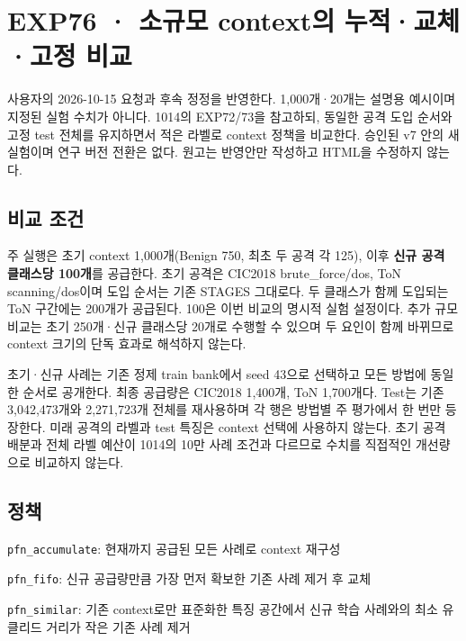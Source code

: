 \section{EXP76 · 소규모 context의 누적·교체·고정 비교}
사용자의 2026-10-15 요청과 후속 정정을 반영한다. 1,000개·20개는 설명용 예시이며 지정된 실험 수치가 아니다. 1014의 EXP72/\allowbreak{}73을 참고하되, 동일한 공격 도입 순서와 고정 test 전체를 유지하면서 적은 라벨로 context 정책을 비교한다. 승인된 v7 안의 새 실험이며 연구 버전 전환은 없다. 원고는 반영안만 작성하고 HTML을 수정하지 않는다.

\subsection{비교 조건}
주 실행은 초기 context 1,000개(Benign 750, 최초 두 공격 각 125), 이후 \textbf{신규 공격 클래스당 100개}를 공급한다. 초기 공격은 CIC2018 brute\_\allowbreak{}force/\allowbreak{}dos, ToN scanning/\allowbreak{}dos이며 도입 순서는 기존 STAGES 그대로다. 두 클래스가 함께 도입되는 ToN 구간에는 200개가 공급된다. 100은 이번 비교의 명시적 실험 설정이다. 추가 규모 비교는 초기 250개·신규 클래스당 20개로 수행할 수 있으며 두 요인이 함께 바뀌므로 context 크기의 단독 효과로 해석하지 않는다.

초기·신규 사례는 기존 정제 train bank에서 seed 43으로 선택하고 모든 방법에 동일한 순서로 공개한다. 최종 공급량은 CIC2018 1,400개, ToN 1,700개다. Test는 기존 3,042,473개와 2,271,723개 전체를 재사용하며 각 행은 방법별 주 평가에서 한 번만 등장한다. 미래 공격의 라벨과 test 특징은 context 선택에 사용하지 않는다. 초기 공격 배분과 전체 라벨 예산이 1014의 10만 사례 조건과 다르므로 수치를 직접적인 개선량으로 비교하지 않는다.

\subsection{정책}
\par\noindent \textbullet\enspace \texttt{pfn\_\allowbreak{}\allowbreak{}accu\allowbreak{}mulate}: 현재까지 공급된 모든 사례로 context 재구성


\par\noindent \textbullet\enspace \texttt{pfn\_\allowbreak{}\allowbreak{}fifo\allowbreak{}}: 신규 공급량만큼 가장 먼저 확보한 기존 사례 제거 후 교체


\par\noindent \textbullet\enspace \texttt{pfn\_\allowbreak{}\allowbreak{}simi\allowbreak{}lar}: 기존 context로만 표준화한 특징 공간에서 신규 학습 사례와의 최소 유클리드 거리가 작은 기존 사례 제거


